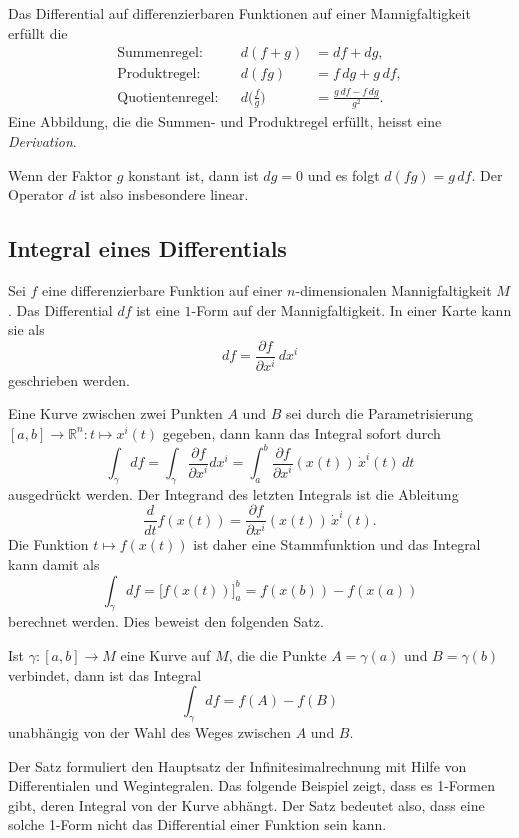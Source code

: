 \begin{satz}
Das Differential auf differenzierbaren Funktionen auf einer
Mannigfaltigkeit erfüllt die
\begin{align*}
\text{Summenregel:}& & d(f+g)&= df + dg, \\[6pt]
\text{Produktregel:}& & d(fg) &= f\,dg + g\,df,\\
\text{Quotientenregel:}& & d\biggl(\frac{f}{g}\biggr) &= \frac{g\,df - f\,dg}{g^2}.
\end{align*}
Eine Abbildung, die die Summen- und Produktregel erfüllt, heisst eine
{\em Derivation}.
%
\end{satz}
Wenn der Faktor $g$ konstant ist, dann ist $dg=0$ und es folgt
$d(fg) = g\,df$.
Der Operator $d$ ist also insbesondere linear.

%
%
\subsection{Integral eines Differentials}
Sei $f$ eine differenzierbare Funktion auf einer $n$-dimensionalen
Mannigfaltigkeit $M$.
Das Differential $df$ ist eine $1$-Form auf der Mannigfaltigkeit.
In einer Karte kann sie als
\[
df
=
\frac{\partial f}{\partial x^i}\,dx^i
\]
geschrieben werden.

Eine Kurve zwischen zwei Punkten $A$ und $B$ sei durch die 
Parametrisierung $[a,b]\to\mathbb{R}^n:t\mapsto x^i(t)$ gegeben,
dann kann das Integral sofort durch
\[
\int_{\gamma} df
=
\int_{\gamma} \frac{\partial f}{\partial x^i} dx^i
=
\int_a^b \frac{\partial f}{\partial x^i}(x(t))\,\dot{x}^i(t)\,dt
\]
ausgedrückt werden.
Der Integrand des letzten Integrals ist die Ableitung
\[
\frac{d}{dt} f(x(t))
=
\frac{\partial f}{\partial x^i}(x(t))\,\dot{x}^i(t).
\]
Die Funktion $t\mapsto f(x(t))$ ist daher eine Stammfunktion und
das Integral kann damit als
\[
\int_{\gamma} df
=
\bigl[ f(x(t)) \bigr]_a^b
=
f(x(b)) - f(x(a))
\]
berechnet werden.
Dies beweist den folgenden Satz.

\begin{satz}
Ist $\gamma\colon[a,b]\to M$ eine Kurve auf $M$, die die Punkte $A=\gamma(a)$
und $B=\gamma(b)$ verbindet, dann ist das Integral
\[
\int_\gamma df
=
f(A) - f(B)
\]
unabhängig von der Wahl des Weges zwischen $A$ und $B$.
\end{satz}

Der Satz formuliert den Hauptsatz der Infinitesimalrechnung mit Hilfe
von Differentialen und Wegintegralen.
Das folgende Beispiel zeigt, dass es 1-Formen gibt, deren Integral
von der Kurve abhängt.
Der Satz bedeutet also, dass eine solche 1-Form nicht das Differential
einer Funktion sein kann.

